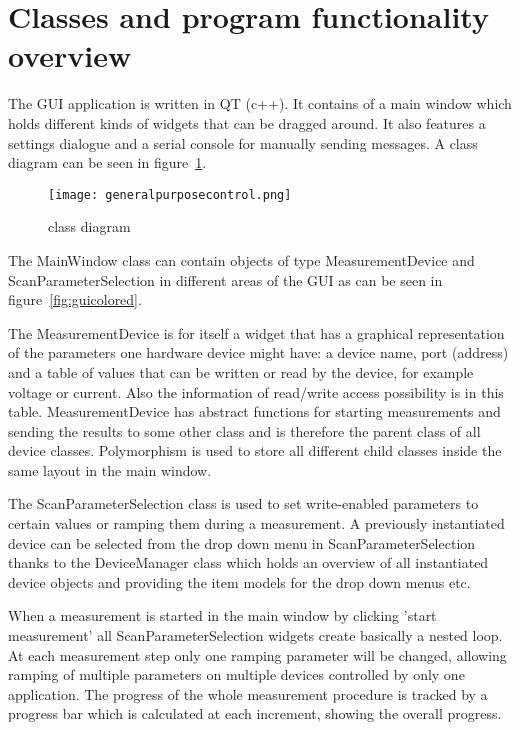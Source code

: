 \newpage
\section{Classes and program functionality overview}
The GUI application is written in QT (c++). It contains of a main window which holds different kinds of widgets that can be dragged around. It also features a settings dialogue and a serial console for manually sending messages.
A class diagram can be seen in figure~\ref{fig:classdiagram}.
\par\bigskip
\begin{figure}[h]
	\texttt{[image: generalpurposecontrol.png]}
	\caption{class diagram}
	\label{fig:classdiagram}
\end{figure}
\par\bigskip

The MainWindow class can contain objects of type MeasurementDevice and ScanParameterSelection in different areas of the GUI as can be seen in figure~\ref{fig:guicolored}.\par\bigskip

The MeasurementDevice is for itself a widget that has a graphical representation of the parameters one hardware device might have: a device name, port (address) and a table of values that can be written or read by the device, for example voltage or current. Also the information of read/write access possibility is in this table. MeasurementDevice has abstract functions for starting measurements and sending the results to some other class and is therefore the parent class of all device classes. Polymorphism is used to store all different child classes inside the same layout in the main window.\par\bigskip

The ScanParameterSelection class is used to set write-enabled parameters to certain values or ramping them during a measurement. A previously instantiated device can be selected from the drop down menu in ScanParameterSelection thanks to the DeviceManager class which holds an overview of all instantiated device objects and providing the item models for the drop down menus etc.\par\bigskip

When a measurement is started in the main window by clicking 'start measurement' all ScanParameterSelection widgets create basically a nested loop. At each measurement step only one ramping parameter will be changed, allowing ramping of multiple parameters on multiple devices controlled by only one application. The progress of the whole measurement procedure is tracked by a progress bar which is calculated at each increment, showing the overall progress.\newpage

